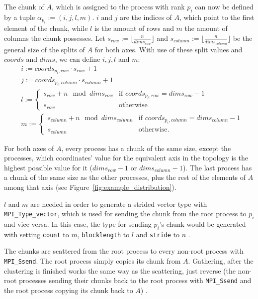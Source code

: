 \documentclass[twoside,11pt]{article}
\begin{document}
The chunk of $A$, which is assigned to the process with
rank $p_i$ can now be defined by a tuple
$\alpha_{p_i} := (i, j, l, m)$.
$i$ and $j$ are the indices of $A$, which point to the
first element of the chunk, while $l$ is the amount of rows
and $m$ the amount of columns the chunk possesses.
Let $s_{row} := \lfloor \frac{n}{dims_{row}} \rfloor$ and
$s_{column} := \lfloor \frac{n}{dims_{column}} \rfloor$ be
the general size of the splits of $A$ for both axes.
With use of these split values and $coords$ and $dims$, we
can define $i, j, l$ and $m$:
\begin{align*}
  &i := coords_{p_i,row} \cdot s_{row} + 1 \\
  &j := coords_{p_i, column} \cdot s_{column} + 1 \\
  &l := \begin{cases}
    s_{row} + n \mod dims_{row} &\text{if } coords_{p_i, row} = dims_{row} - 1 \\
    s_{row} &\text{otherwise}
  \end{cases} \\
  &m := \begin{cases}
    s_{column} + n \mod dims_{column} &\text{if } coords_{p_i, column} = dims_{column} - 1 \\
    s_{column} &\text{otherwise}.
  \end{cases}
\end{align*}

For both axes of $A$, every process has a chunk of the same
size, except the processes, which coordinates' value for
the equivalent axis in the topology is the highest possible
value for it ($dims_{row} - 1$ or $dims_{column} - 1$).
The last process has a chunk of the same size as the other
processes, plus the rest of the elements of $A$ among that
axis (see Figure~\ref{fig:example_distribution}).

$l$ and $m$ are needed in order to generate a strided
vector type with \texttt{MPI\_Type\_vector}, which is used
for sending the chunk from the root process to $p_i$ and
vice versa.
In this case, the type for sending $p_i$'s chunk would be
generated with setting \texttt{count} to $m$,
\texttt{blocklength} to $l$ and \texttt{stride} to $n$
\citep[see][Chapter 4]{mpi}.

The chunks are scattered from the root process to every
non-root process with \texttt{MPI\_S\-send}.
The root process simply copies its chunk from $A$.
Gathering, after the clustering is finished works the same
way as the scattering, just reverse (the non-root processes
sending their chunks back to the root process with
\texttt{MPI\_Ssend} and the root process copying its chunk
back to $A$) \citep[see Algorithm~\ref{alg:perc_par},
lines 5,7 and][Chapter 3]{mpi}.
\end{document}
